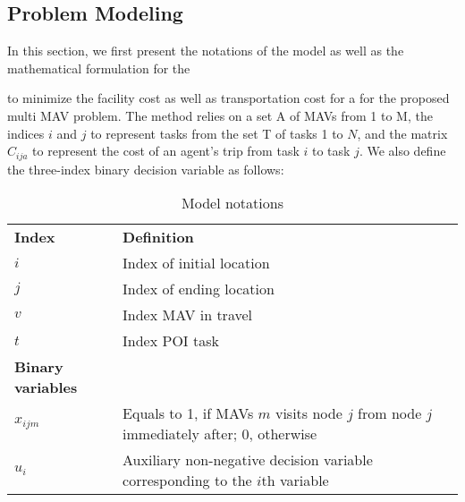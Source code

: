 \documentclass[preprint,review, 11pt,3p,authoryear]{elsarticle}
\newcommand{\rev}{\color{black}} %
\begin{document}
\subsection{Problem Modeling}
In this section, we first present the notations of the model as well as the mathematical formulation for the {\rev{mTSPGA}  to minimize the facility cost as well as transportation cost for a {\rev{mTSPGA}} for the proposed multi MAV problem. The method relies on a set A of MAVs from 1 to M, the indices $i$ and $j$ to represent tasks from the set T of tasks 1 to $N$, and the matrix $C_{ija}$ to represent the cost of an agent's trip from task $i$ to task $j$.
We also define the three-index binary decision variable as follows:


\begin{table}[!htbp]
\centering
\caption{Model notations}
\footnotesize
\label{Indx}
\begin{tabular}{ll}
\textbf{Index}                   & \textbf{Definition}                                                          \\
$i$                              & Index of initial location \\
$j$                              & Index of ending location \\

$v$                              & Index MAV in travel \\

$t$                              & Index POI task  \\
\textbf{Binary variables}        &                                                                              \\
$x_{ijm}$                        & Equals to 1, if MAVs $m$ visits node $j$ from node $j$ immediately after; 0, otherwise \\
$u_{i}$                 & Auxiliary non-negative decision variable corresponding to the $i$th variable  \\


\end{tabular}
\end{table}}
\end{document}
